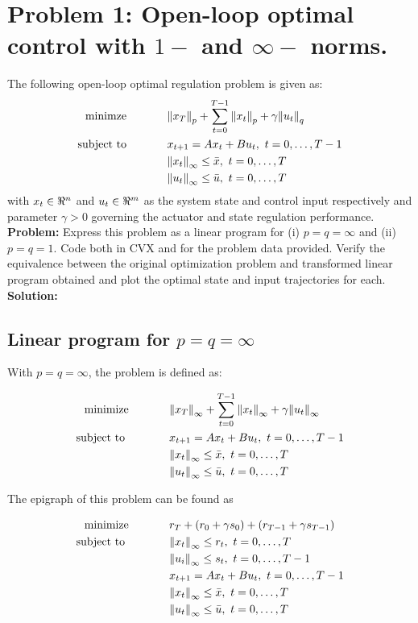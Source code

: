 \documentclass[letter]{article}
\newcommand{\optpblm}[3][eq:default]{
	\begin{equation}\label{#1}
		\begin{aligned}
			\text{minimize} \hspace{0.5in} &#2\vspace{5pt}\\
			\text{subject to \hspace{0.5in}} &#3
		\end{aligned}	
	\end{equation}
}
\begin{document}
\section{Problem 1: Open-loop optimal control with $1-$ and $\infty-$ norms.}
The following open-loop optimal regulation problem is given as:
\begin{equation}\label{eq:open-loop_opt-control_def}
	\begin{aligned}
		\text{minimze} \hspace{0.5in}
		&\norm{x_T}_p + \sum_{t = 0}^{T-1} \norm{x_t}_p + \gamma\norm{u_t}_q\\
		\text{subject to} \hspace{0.5in}
		& x_{t+1} = A x_t + B u_t, \ t = 0,\dots,T-1\\
		& \norm{x_t}_\infty \leq \bar{x}, \ t = 0,\dots,T\\
		& \norm{u_t}_\infty \leq \bar{u}, \ t = 0,\dots,T
	\end{aligned}
\end{equation}
with $x_t \in \real^n$ and $u_t \in \real^m$ as the system state and control input respectively and parameter $\gamma > 0$ governing the actuator and state regulation performance.\\

\textbf{Problem:}
Express this problem as a linear program for (i) $p=q=\infty$ and (ii) $p=q=1$. Code both in CVX and for the problem data provided. Verify the equivalence between the original optimization problem and transformed linear program obtained and plot the optimal state and input trajectories for each.\\

\textbf{Solution:}
\subsection{Linear program for $p = q = \infty$}

With $p = q = \infty$, the problem is defined as:
\optpblm{\norm{x_T}_\infty + \sum_{t = 0}^{T-1} \norm{x_t}_\infty + \gamma\norm{u_t}_\infty}{
	x_{t+1} = A x_t + B u_t, \ t = 0,\dots,T-1\\
	& \norm{x_t}_\infty \leq \bar{x}, \ t = 0,\dots,T\\
	& \norm{u_t}_\infty \leq \bar{u}, \ t = 0,\dots,T}

The epigraph of this problem can be found as
\optpblm{r_T + (r_0 + \gamma s_0) + (r_{T-1} + \gamma s_{T-1})}{
	\norm{x_t}_\infty \leq r_t, \ t = 0, \dots, T\\
	&\norm{u_i}_\infty \leq s_t, \ t = 0, \dots, T-1\\
	&x_{t+1} = A x_t + B u_t, \ t = 0,\dots,T-1\\
	& \norm{x_t}_\infty \leq \bar{x}, \ t = 0,\dots,T\\
	& \norm{u_t}_\infty \leq \bar{u}, \ t = 0,\dots,T
	}
\end{document}
